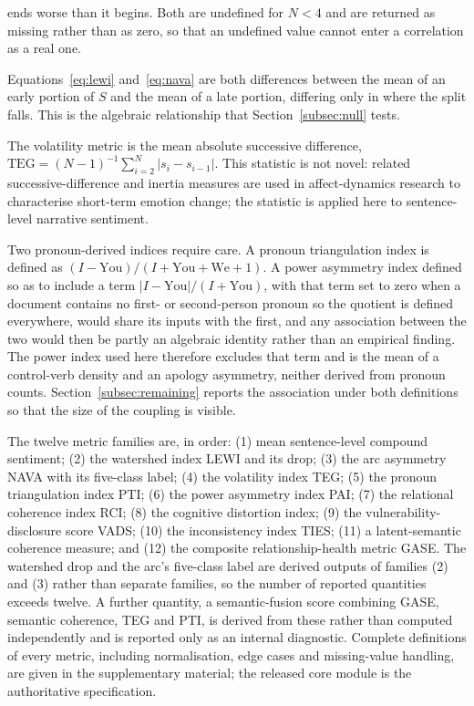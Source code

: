 \documentclass[fleqn,10pt]{wlscirep}
\begin{document}
ends worse than it begins. Both are undefined for $N<4$ and are returned as missing rather than as zero, so that an undefined value cannot enter a correlation as a real one.

Equations~\eqref{eq:lewi} and~\eqref{eq:nava} are both differences between the mean of an early portion of $S$ and the mean of a late portion, differing only in where the split falls. This is the algebraic relationship that Section~\ref{subsec:null} tests.

The volatility metric is the mean absolute successive difference, $\mathrm{TEG} = (N-1)^{-1}\sum_{i=2}^{N}|s_i - s_{i-1}|$. This statistic is not novel: related successive-difference and inertia measures are used in affect-dynamics research to characterise short-term emotion change\cite{kuppens2010,houben2015}; the statistic is applied here to sentence-level narrative sentiment.

Two pronoun-derived indices require care. A pronoun triangulation index is defined as $(I-\mathrm{You})/(I+\mathrm{You}+\mathrm{We}+1)$. A power asymmetry index defined so as to include a term $|I-\mathrm{You}|/(I+\mathrm{You})$, with that term set to zero when a document contains no first- or second-person pronoun so the quotient is defined everywhere, would share its inputs with the first, and any association between the two would then be partly an algebraic identity rather than an empirical finding. The power index used here therefore excludes that term and is the mean of a control-verb density and an apology asymmetry, neither derived from pronoun counts. Section~\ref{subsec:remaining} reports the association under both definitions so that the size of the coupling is visible.

The twelve metric families are, in order: (1) mean sentence-level compound sentiment; (2) the watershed index LEWI and its drop; (3) the arc asymmetry NAVA with its five-class label; (4) the volatility index TEG; (5) the pronoun triangulation index PTI; (6) the power asymmetry index PAI; (7) the relational coherence index RCI; (8) the cognitive distortion index; (9) the vulnerability-disclosure score VADS; (10) the inconsistency index TIES; (11) a latent-semantic coherence measure; and (12) the composite relationship-health metric GASE. The watershed drop and the arc's five-class label are derived outputs of families (2) and (3) rather than separate families, so the number of reported quantities exceeds twelve. A further quantity, a semantic-fusion score combining GASE, semantic coherence, TEG and PTI, is derived from these rather than computed independently and is reported only as an internal diagnostic. Complete definitions of every metric, including normalisation, edge cases and missing-value handling, are given in the supplementary material; the released core module is the authoritative specification.
\end{document}
